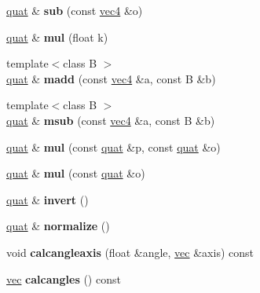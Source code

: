 \begin{DoxyCompactItemize}
\mbox{\label{structquat_ab604950c271dc05b4f5d8c38aef61b2f}} 
\hyperlink{structquat}{quat} \& {\bfseries sub} (const \hyperlink{structvec4}{vec4} \&o)
\item 
\mbox{\label{structquat_ad42d151ed650153752d750399febf1a0}} 
\hyperlink{structquat}{quat} \& {\bfseries mul} (float k)
\item 
\mbox{\label{structquat_a094b10f1e252c3a69671f1a4e169a797}} 
{\footnotesize template$<$class B $>$ }\\\hyperlink{structquat}{quat} \& {\bfseries madd} (const \hyperlink{structvec4}{vec4} \&a, const B \&b)
\item 
\mbox{\label{structquat_ac9b31f22cc918da8e2d3e34580d5d242}} 
{\footnotesize template$<$class B $>$ }\\\hyperlink{structquat}{quat} \& {\bfseries msub} (const \hyperlink{structvec4}{vec4} \&a, const B \&b)
\item 
\mbox{\label{structquat_a167d8d312d429900212642fdda52b01c}} 
\hyperlink{structquat}{quat} \& {\bfseries mul} (const \hyperlink{structquat}{quat} \&p, const \hyperlink{structquat}{quat} \&o)
\item 
\mbox{\label{structquat_a3e4f931398a6d04331c8ecdf047e99f4}} 
\hyperlink{structquat}{quat} \& {\bfseries mul} (const \hyperlink{structquat}{quat} \&o)
\item 
\mbox{\label{structquat_a8e02a8a29c7870bf47cb912624bf9956}} 
\hyperlink{structquat}{quat} \& {\bfseries invert} ()
\item 
\mbox{\label{structquat_a9a4ff4d8a0b3c4d4481400e539068bea}} 
\hyperlink{structquat}{quat} \& {\bfseries normalize} ()
\item 
\mbox{\label{structquat_a1f670b133defa6d4ccca6c4a6d3d9a21}} 
void {\bfseries calcangleaxis} (float \&angle, \hyperlink{structvec}{vec} \&axis) const
\item 
\mbox{\label{structquat_a03093e4baea6a1fbf50f9a3661aa7318}} 
\hyperlink{structvec}{vec} {\bfseries calcangles} () const

\end{DoxyCompactItemize}
